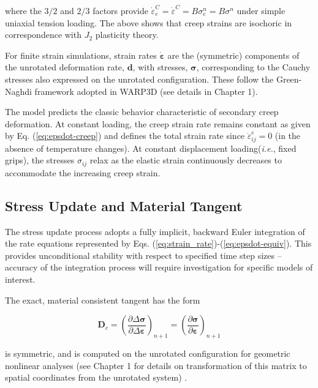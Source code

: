 \documentclass[11pt]{report}
\numberwithin{equation}{section}
\newcommand{\ie}{\emph{i.e.},\xspace}
\newcommand{\veps}{\varepsilon}
\newcommand{\noi}{\noindent}
\begin{document}
\noi where the $3/2$ and $2/3$ factors   provide 
$\dot \veps_e^C = \dot \veps^C = B \sigma_e^n= B \sigma^n$ under simple uniaxial tension loading.
The above shows that creep strains are isochoric in correspondence with $J_2$ plasticity theory.

For finite strain simulations, strain rates $\dot{\bm{\veps}}$ are the (symmetric) components of
the unrotated deformation rate, $\textbf{d}$, with stresses, $\bm{\sigma}$, corresponding to the Cauchy
stresses also expressed on the unrotated configuration. These follow the
Green-Naghdi framework adopted in WARP3D (see details in Chapter 1).

The model predicts the classic behavior characteristic of secondary creep
deformation. At constant loading, the creep strain rate remains 
constant as given by Eq. (\ref{eq:epsdot-creep}) and defines the total strain rate since
$\dot\veps_{ij}^e=0$ (in the absence of temperature changes). At constant displacement
loading(\ie fixed grips), the stresses $\sigma_{ij}$ relax as the elastic strain 
continuously decreases to
accommodate the increasing creep strain.



\subsection {Stress Update and Material Tangent}
The stress update process adopts a fully implicit, backward Euler integration of the
rate equations represented by Eqs. (\ref{eq:strain_rate})-(\ref{eq:epsdot-equiv}). This provides
unconditional stability with respect to specified time step sizes -- accuracy of the integration
process will require investigation for specific models of interest.

The exact, material consistent tangent has the form
 
\begin{equation}
\mathbf D_c = \left ( \frac{\partial\Delta \bm{\sigma }}{\partial\Delta \bm{\varepsilon}} \right )_{n+1}= 
\left ( \frac{\partial\bm{\sigma}}{\partial\bm{\varepsilon}}\right )_{n+1}  \label{eq:defDc}
\end{equation}

\noi is symmetric, and is computed on the unrotated configuration for geometric nonlinear analyses
(see Chapter 1 for details on transformation of this matrix to spatial 
coordinates from the unrotated system) .
\end{document}
